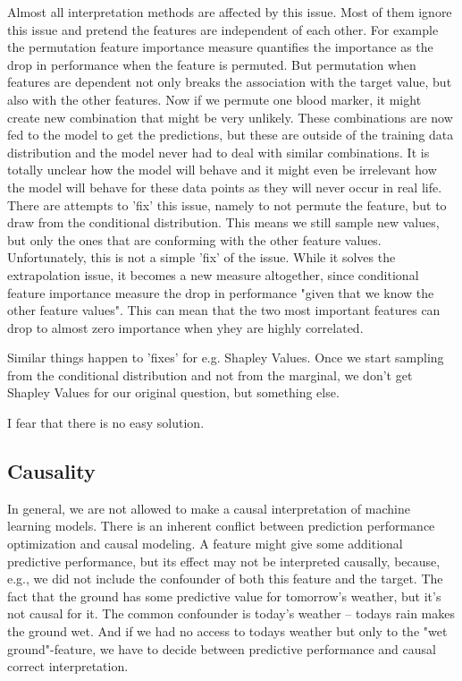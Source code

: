\documentclass[runningheads]{llncs}
\begin{document}
Almost all interpretation methods are affected by this issue.
Most of them ignore this issue and pretend the features are independent of each other.
For example the permutation feature importance measure quantifies the importance as the drop in performance when the feature is permuted.
But permutation when features are dependent not only breaks the association with the target value, but also with the other features.
Now if we permute one blood marker, it might create new combination that might be very unlikely.
These combinations are now fed to the model to get the predictions, but these are outside of the training data distribution and the model never had to deal with similar combinations.
It is totally unclear how the model will behave and it might even be irrelevant how the model will behave for these data points as they will never occur in real life.
There are attempts to 'fix' this issue, namely to not permute the feature, but to draw from the conditional distribution.
This means we still sample new values, but only the ones that are conforming with the other feature values.
Unfortunately, this is not a simple 'fix' of the issue.
While it solves the extrapolation issue, it becomes a new measure altogether, since conditional feature importance measure the drop in performance "given that we know the other feature values".
This can mean that the two most important features can drop to almost zero importance when yhey are highly correlated.

Similar things happen to 'fixes' for e.g. Shapley Values.
Once we start sampling from the conditional distribution and not from the marginal, we don't get Shapley Values for our original question, but something else.

I fear that there is no easy solution.


\subsection{Causality}
In general, we are not allowed to make a causal interpretation of machine learning models.
There is an inherent conflict between prediction performance optimization and causal modeling.
A feature might give some additional predictive performance, but its effect may not be interpreted causally, because, e.g., we did not include the confounder of both this feature and the target.
The fact that the ground has some predictive value for tomorrow's weather, but it's not causal for it.
The common confounder is today's weather -- todays rain makes the ground wet.
And if we had no access to todays weather but only to the "wet ground"-feature, we have to decide between predictive performance and causal correct interpretation.
\end{document}
